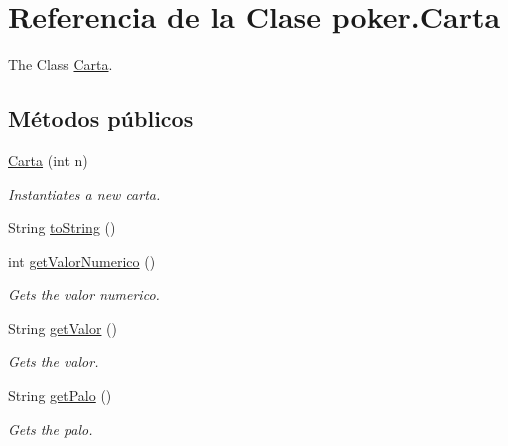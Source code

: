 \hypertarget{classpoker_1_1Carta}{}\section{Referencia de la Clase poker.\+Carta}
\label{classpoker_1_1Carta}


The Class \mbox{\hyperlink{classpoker_1_1Carta}{Carta}}.  


\subsection*{Métodos públicos}
\begin{DoxyCompactItemize}
\item 
\mbox{\hyperlink{classpoker_1_1Carta_a6c938fe144f69fc14694f763781019e0}{Carta}} (int n)
\begin{DoxyCompactList}\small\item\em Instantiates a new carta. \end{DoxyCompactList}\item 
String \mbox{\hyperlink{classpoker_1_1Carta_a80da70637c7b234024b41d63957d7064}{to\+String}} ()
\item 
int \mbox{\hyperlink{classpoker_1_1Carta_a24fcaa25f7ab08bdcece39332baaa00c}{get\+Valor\+Numerico}} ()
\begin{DoxyCompactList}\small\item\em Gets the valor numerico. \end{DoxyCompactList}\item 
String \mbox{\hyperlink{classpoker_1_1Carta_ae9d8ef2d8530e4331a61dbf0d361e871}{get\+Valor}} ()
\begin{DoxyCompactList}\small\item\em Gets the valor. \end{DoxyCompactList}\item 
String \mbox{\hyperlink{classpoker_1_1Carta_acc0513aa782c9388c849b2c0ec7ebf86}{get\+Palo}} ()
\begin{DoxyCompactList}\small\item\em Gets the palo. \end{DoxyCompactList}\end{DoxyCompactItemize}
